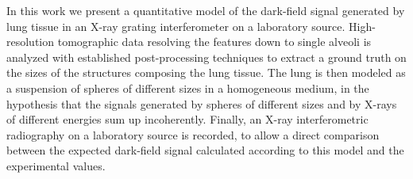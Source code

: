 In this work we present a quantitative model of the dark-field signal
generated by lung tissue in an X-ray grating interferometer on a laboratory
source. High-resolution tomographic data resolving the features down to single
alveoli is analyzed with established post-processing techniques to extract a
ground truth on the sizes of the structures composing the lung tissue. The
lung is then modeled as a suspension of spheres of different sizes in a
homogeneous medium, in the hypothesis that the signals generated by spheres
of different sizes and by X-rays of different energies sum up incoherently.
Finally, an X-ray interferometric radiography on a laboratory source is
recorded, to allow a direct comparison between the expected dark-field
signal calculated according to this model and the experimental values.

